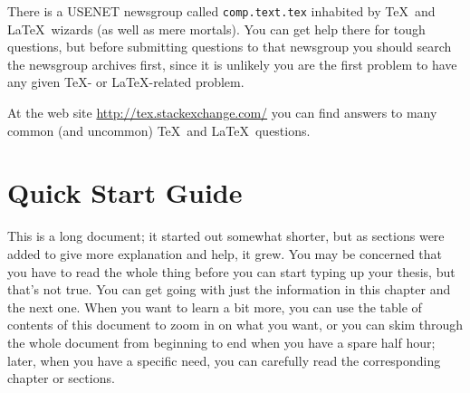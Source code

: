 There is a USENET newsgroup called \verb|comp.text.tex| inhabited by
\TeX\ and \LaTeX\ wizards (as well as mere mortals).  You can get help
there for tough questions, but before submitting questions to that
newsgroup you should search the newsgroup archives first, since it is
unlikely you are the first problem to have any given \TeX- or
\LaTeX-related problem.

At the web site \url{http://tex.stackexchange.com/} you can find
answers to many common (and uncommon) \TeX\ and \LaTeX\ questions.


\section{Quick Start Guide}

This is a long document; it started out somewhat shorter, but as
sections were added to give more explanation and help, it grew.  You
may be concerned that you have to read the whole thing before you can
start typing up your thesis, but that's not true.  You can get going
with just the information in this chapter and the next one.  When you
want to learn a bit more, you can use the table of contents of this
document to zoom in on what you want, or you can skim through the
whole document from beginning to end when you have a spare half hour;
later, when you have a specific need, you can carefully read the
corresponding chapter or sections.

